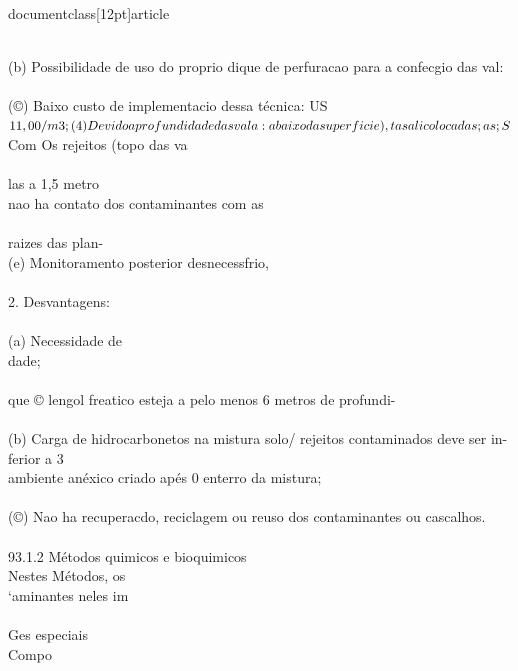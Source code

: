 \\documentclass[12pt]{article}
\begin{document}
{{{{\\
(b) Possibilidade de uso do proprio dique de perfuracao para a confecgio das val:\\
\\
(©) Baixo custo de implementacio dessa técnica: US\\$ 11,00/m3;\\
\\
(4) Devido a profundidade das vala:\\
abaixo da superficie),\\
tas ali colocadas;\\
\\
as;\\
\\
S\\$ Com Os rejeitos (topo das va\\
\\
las a 1,5 metro\\
nao ha contato dos contaminantes com as\\
\\
raizes das plan-\\
(e) Monitoramento posterior desnecessfrio,\\
\\
2. Desvantagens:\\
\\
(a) Necessidade de\\
dade;\\
\\
que © lengol freatico esteja a pelo menos 6 metros de profundi-\\
\\
(b) Carga de hidrocarbonetos na mistura solo/ rejeitos contaminados deve ser in-\\
ferior a 3\\%
ambiente anéxico criado apés 0 enterro da mistura;\\
\\
(©) Nao ha recuperacdo, reciclagem ou reuso dos contaminantes ou cascalhos.\\
\\
93.1.2 Métodos quimicos e bioquimicos\\
Nestes Métodos, os\\
‘aminantes neles im\\
\\
Ges especiais\\
Compo\\
\\
}}}}
\end{document}
